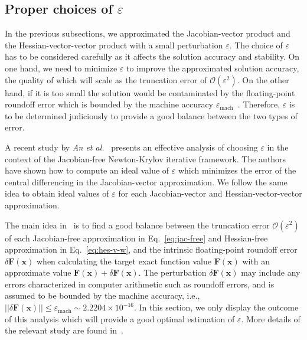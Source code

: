 \documentclass[times,preprint,3p]{elsarticle}
\newcommand{\bF}{\mathbf{F}}
\newcommand{\bx}{\mathbf{x}}
\begin{document}
\subsection{Proper choices of $\varepsilon$}\label{subsec:epsilon}

In the previous subsections, we approximated
the Jacobian-vector product and the Hessian-vector-vector product
with a small perturbation \( \varepsilon \).
The choice of \( \varepsilon \) has to be considered carefully
as it affects the solution accuracy and stability.
On one hand, we need to minimize \( \varepsilon \)
to improve the approximated solution accuracy,
the quality of which will scale as the truncation error of
$\mathcal{O}(\varepsilon^{2})$.
On the other hand, if it is too small
the solution would be contaminated by
the floating-point roundoff error which is bounded by
the machine accuracy
\( \varepsilon_{\text{mach}} \)~\cite{knoll2004jacobian}.
%
Therefore, $\varepsilon$ is to be determined judiciously
to provide a good balance between the two types of error.
%

A recent study by \textit{An et al.}~\cite{an2011finite}
presents an effective analysis of choosing
\( \varepsilon \) in the context of the Jacobian-free Newton-Krylov iterative framework.
The authors have shown how to compute an ideal value of
\( \varepsilon \) which minimizes the error of the
central differencing in the Jacobian-vector approximation.
We follow the same idea to obtain ideal values of \( \varepsilon \)
for each Jacobian-vector and Hessian-vector-vector approximation.


The main idea in~\cite{an2011finite} is to find a good
balance between the truncation error \( \mathcal{O}(\varepsilon^{2}) \)
of each Jacobian-free approximation in Eq.~\eqref{eq:jac-free}
and Hessian-free approximation in Eq.~\eqref{eq:hes-v-w},
and the intrinsic floating-point roundoff error $\delta\bF(\bx)$ when calculating
the target exact function value $\bF(\bx)$ with
an approximate value $\bF(\bx) + \delta\bF(\bx)$.
The perturbation $\delta\bF(\bx)$ may include any errors characterized
in computer arithmetic such as roundoff errors, and is assumed to be
bounded by the machine accuracy,
i.e., $|| \delta\bF(\bx) || \le \varepsilon_{\text{mach}}\sim 2.2204 \times 10^{-16}$.
In this section, we only display the outcome of this analysis which will provide a good optimal estimation
of $\varepsilon$. More details of the relevant study are found in~\cite{an2011finite,knoll2004jacobian}.
\end{document}
